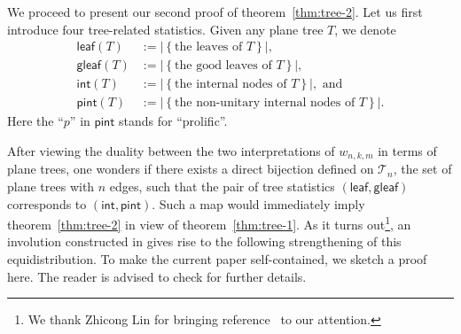 \documentclass[reqno]{amsart}
\numberwithin{equation}{section}
\theoremstyle{definition}
\theoremstyle{named}
\newcommand{\abs}[1]{\left|#1\right|}
\newcommand{\set}[1]{\left\{#1\right\}}
\newcommand{\cT}{\mathcal{T}}
\def\leaf{\mathsf{leaf}}
\def\gleaf{\mathsf{gleaf}}
\def\int{\mathsf{int}}
\def\pint{\mathsf{pint}}
\begin{document}
We proceed to present our second proof of theorem~\ref{thm:tree-2}. Let us first introduce four tree-related statistics. Given any plane tree $T$, we denote
\begin{align*}
\leaf(T) &:=\abs{\set{\text{the leaves of $T$}}},\\
\gleaf(T) &:=\abs{\set{\text{the good leaves of $T$}}},\\
\int(T) &:=\abs{\set{\text{the internal nodes of $T$}}}, \text{ and}\\
\pint(T) &:=\abs{\set{\text{the non-unitary internal nodes of $T$}}}.  
\end{align*}
Here the ``$p$'' in $\pint$ stands for ``prolific''.

After viewing the duality between the two interpretations of $w_{n,k,m}$ in terms of plane trees, one wonders if there exists a direct bijection defined on $\cT_n$, the set of plane trees with $n$ edges, such that the pair of tree statistics $(\leaf,\gleaf)$ corresponds to $(\int,\pint)$. Such a map would immediately imply theorem~\ref{thm:tree-2} in view of theorem~\ref{thm:tree-1}. As it turns out\footnote{We thank Zhicong Lin for bringing reference~\cite{LLZ2024} to our attention.}, an involution constructed in \cite{LLZ2024} gives rise to the following strengthening of this equidistribution. To make the current paper self-contained, we sketch a proof here. The reader is advised to check \cite[Thm.~2.2]{LLZ2024} for further details.
\end{document}
